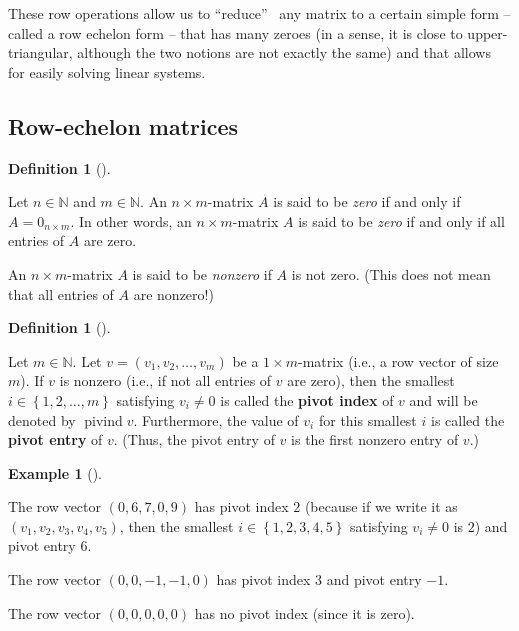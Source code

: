 \documentclass[numbers=enddot,12pt,final,onecolumn,notitlepage]{scrartcl}%
\theoremstyle{definition}
\newtheorem{defi}[theo]{Definition}
\newenvironment{definition}[1][]
{\begin{defi}[#1]\begin{leftbar}}
{\end{leftbar}\end{defi}}
\newtheorem{exam}[theo]{Example}
\newenvironment{example}[1][]
{\begin{exam}[#1]\begin{leftbar}}
{\end{leftbar}\end{exam}}
\begin{document}
These row operations allow us to \textquotedblleft reduce\textquotedblright%
\ any matrix to a certain simple form -- called a row echelon form -- that has
many zeroes (in a sense, it is close to upper-triangular, although the two
notions are not exactly the same) and that allows for easily solving linear systems.

\subsection{\label{sect.gauss.row-echelon}Row-echelon matrices}

\begin{definition}
Let $n\in\mathbb{N}$ and $m\in\mathbb{N}$. An $n\times m$-matrix $A$ is said
to be \textit{zero} if and only if $A=0_{n\times m}$. In other words, an
$n\times m$-matrix $A$ is said to be \textit{zero} if and only if all entries
of $A$ are zero.

An $n\times m$-matrix $A$ is said to be \textit{nonzero} if $A$ is not zero.
(This does not mean that all entries of $A$ are nonzero!)
\end{definition}

\begin{definition}
\label{def.pivot}Let $m\in\mathbb{N}$. Let $v=\left(  v_{1},v_{2},\ldots
,v_{m}\right)  $ be a $1\times m$-matrix (i.e., a row vector of size $m$). If
$v$ is nonzero (i.e., if not all entries of $v$ are zero), then the smallest
$i\in\left\{  1,2,\ldots,m\right\}  $ satisfying $v_{i}\neq0$ is called the
\textbf{pivot index} of $v$ and will be denoted by $\operatorname*{pivind}v$.
Furthermore, the value of $v_{i}$ for this smallest $i$ is called the
\textbf{pivot entry} of $v$. (Thus, the pivot entry of $v$ is the first
nonzero entry of $v$.)
\end{definition}

\begin{example}
The row vector $\left(  0,6,7,0,9\right)  $ has pivot index $2$ (because if we
write it as $\left(  v_{1},v_{2},v_{3},v_{4},v_{5}\right)  $, then the
smallest $i\in\left\{  1,2,3,4,5\right\}  $ satisfying $v_{i}\neq0$ is $2$)
and pivot entry $6$.

The row vector $\left(  0,0,-1,-1,0\right)  $ has pivot index $3$ and pivot
entry $-1$.

The row vector $\left(  0,0,0,0,0\right)  $ has no pivot index (since it is zero).
\end{example}
\end{document}
